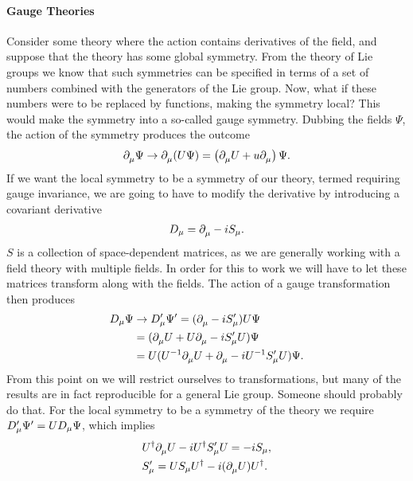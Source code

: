 \paragraph{Gauge Theories}
Consider some theory where the action contains derivatives of the field, and suppose that the theory has some global symmetry. From the theory of Lie groups we know that such symmetries can be specified in terms of a set of numbers combined with the generators of the Lie group. Now, what if these numbers were to be replaced by functions, making the symmetry local? This would make the symmetry into a so-called gauge symmetry. Dubbing the fields $\Psi$, the action of the symmetry produces the outcome
\begin{align*}
	\partial^{}_{\mu}\Psi\to \partial^{}_{\mu}(U\Psi) = \left(\partial^{}_{\mu}U + u\partial^{}_{\mu}\right)\Psi.
\end{align*}
If we want the local symmetry to be a symmetry of our theory, termed requiring gauge invariance, we are going to have to modify the derivative by introducing a covariant derivative
\begin{align*}
	D_{\mu} = \partial^{}_{\mu} - iS_{\mu}.
\end{align*}
$S$ is a collection of space-dependent matrices, as we are generally working with a field theory with multiple fields. In order for this to work we will have to let these matrices transform along with the fields. The action of a gauge transformation then produces
\begin{align*}
	D_{\mu}\Psi &\to D_{\mu}^{\prime}\Psi^{\prime} = (\partial^{}_{\mu} - iS_{\mu}^{\prime})U\Psi \\
	            &= (\partial^{}_{\mu}U + U\partial^{}_{\mu} - iS_{\mu}^{\prime} U)\Psi \\
	            &= U(U^{-1}\partial^{}_{\mu}U + \partial^{}_{\mu} - iU^{-1}S_{\mu}^{\prime} U)\Psi.
\end{align*}
From this point on we will restrict ourselves to  transformations, but many of the results are in fact reproducible for a general Lie group. Someone should probably do that. For the local symmetry to be a symmetry of the theory we require $D_{\mu}^{\prime}\Psi^{\prime} = UD_{\mu}\Psi$, which implies
\begin{align*}
	&U^{\dagger}\partial^{}_{\mu}U - iU^{\dagger} S_{\mu}^{\prime} U = -iS_{\mu}, \\
	&S_{\mu}^{\prime} = US_{\mu}U^{\dagger} - i(\partial^{}_{\mu}U)U^{\dagger}.
\end{align*}


